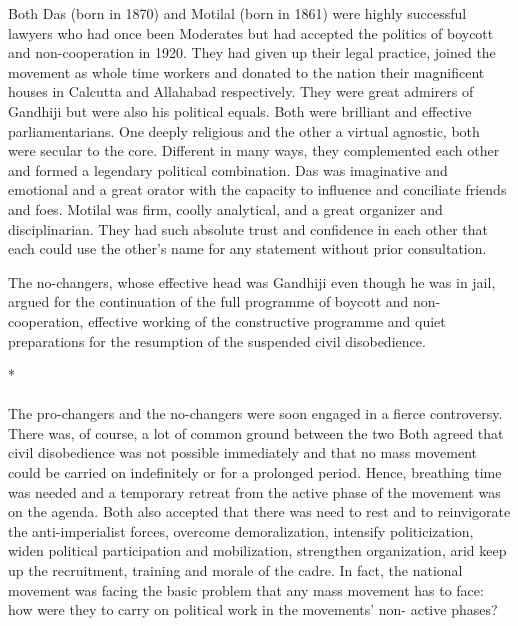 \begin{multicols}{2}
Both Das (born in 1870) and Motilal (born in 1861) were highly successful lawyers who had once been Moderates but had accepted the politics of boycott and non-cooperation in 1920. They had given up their legal practice, joined the movement as whole time workers and donated to the nation their magnificent houses in Calcutta and Allahabad respectively. They were great admirers of Gandhiji but were also his political equals. Both were brilliant and effective parliamentarians. One deeply religious and the other a virtual agnostic, both were secular to the core. Different in many ways, they complemented each other and formed a legendary political combination. Das was imaginative and emotional and a great orator with the capacity to influence and conciliate friends and foes. Motilal was firm, coolly analytical, and a great organizer and disciplinarian. They had such absolute trust and confidence in each other that each could use the other's name for any statement without prior consultation.

The no-changers, whose effective head was Gandhiji even though he was in jail, argued for the continuation of the full programme of boycott and non-cooperation, effective working of the constructive programme and quiet preparations for the resumption of the suspended civil disobedience.

\begin{center}*\end{center}

\paragraph*{}

The pro-changers and the no-changers were soon engaged in a fierce controversy. There was, of course, a lot of common ground between the two Both agreed that civil disobedience was not possible immediately and that no mass movement could be carried on indefinitely or for a prolonged period. Hence, breathing time was needed and a temporary retreat from the active phase of the movement was on the agenda. Both also accepted that there was need to rest and to reinvigorate the anti-imperialist forces, overcome demoralization, intensify politicization, widen political participation and mobilization, strengthen organization, arid keep up the recruitment, training and morale of the cadre. In fact, the national movement was facing the basic problem that any mass movement has to face: how were they to carry on political work in the movements' non- active phases?


\end{multicols}
